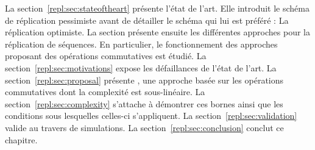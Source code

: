 La section~\ref{repl:sec:stateoftheart} présente l'état de l'art. Elle introduit
le schéma de réplication pessimiste avant de détailler le schéma qui lui est
préféré : La réplication optimiste. La section présente ensuite les différentes
approches pour la réplication de séquences. En particulier, le fonctionnement
des approches proposant des opérations commutatives est étudié. La
section~\ref{repl:sec:motivations} expose les défaillances de l'état de
l'art. La section~\ref{repl:sec:proposal} présente \LSEQ, une approche basée sur
les opérations commutatives dont la complexité est sous-linéaire. La
section~\ref{repl:sec:complexity} s'attache à démontrer ces bornes ainsi que les
conditions sous lesquelles celles-ci s'appliquent. La
section~\ref{repl:sec:validation} valide \LSEQ au travers de simulations. La
section~\ref{repl:sec:conclusion} conclut ce chapitre.


